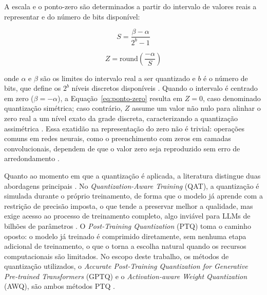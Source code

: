 A escala e o ponto-zero são determinados a partir do intervalo de valores reais a representar e do número de bits disponível:

\begin{equation}
	S = \frac{\beta - \alpha}{2^{b} - 1}
	\label{eq:escala}
\end{equation}

\begin{equation}
	Z = \mathrm{round}\!\left(\frac{-\alpha}{S}\right)
	\label{eq:ponto-zero}
\end{equation}

onde $\alpha$ e $\beta$ são os limites do intervalo real a ser quantizado e $b$ é o número de bits, que define os $2^b$ níveis discretos disponíveis \cite{gholami2022survey}. Quando o intervalo é centrado em zero ($\beta = -\alpha$), a Equação~\ref{eq:ponto-zero} resulta em $Z = 0$, caso denominado quantização simétrica; caso contrário, $Z$ assume um valor não nulo para alinhar o zero real a um nível exato da grade discreta, caracterizando a quantização assimétrica \cite{gholami2022survey}. Essa exatidão na representação do zero não é trivial: operações comuns em redes neurais, como o preenchimento com zeros em camadas convolucionais, dependem de que o valor zero seja reproduzido sem erro de arredondamento \cite{Jacob_2018_CVPR}.

Quanto ao momento em que a quantização é aplicada, a literatura distingue duas abordagens principais \cite{gholami2022survey}. No \textit{Quantization-Aware Training} (QAT), a quantização é simulada durante o próprio treinamento, de forma que o modelo já aprende com a restrição de precisão imposta, o que tende a preservar melhor a qualidade, mas exige acesso ao processo de treinamento completo, algo inviável para LLMs de bilhões de parâmetros \cite{gholami2022survey}. O \textit{Post-Training Quantization} (PTQ) toma o caminho oposto: o modelo já treinado é comprimido diretamente, sem nenhuma etapa adicional de treinamento, o que o torna a escolha natural quando os recursos computacionais são limitados. No escopo deste trabalho, os métodos de quantização utilizados, o \textit{Accurate Post-Training Quantization for Generative Pre-trained Transformers} (GPTQ) e o \textit{Activation-aware Weight Quantization} (AWQ), são ambos métodos PTQ \cite{frantar2023gptq, lin2024awq}.

